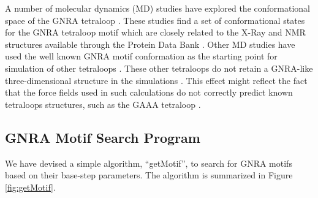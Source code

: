 A  number  of  molecular  dynamics  (MD)  studies  have  explored  the
conformational   space  of   the  GNRA   tetraloop  \cite{cornell1995,
  sorin2002, spackova2010,  depaul2010}. These  studies find a  set of
conformational states  for the GNRA tetraloop motif  which are closely
related to the X-Ray and  NMR structures available through the Protein
Data Bank  \cite{depaul2010, sorin2002}.   Other MD studies  have used
the  well known  GNRA motif  conformation  as the  starting point  for
simulation  of other  tetraloops  \cite{srinivasan1998}.  These  other
tetraloops do  not retain  a GNRA-like three-dimensional  structure in
the simulations  \cite{srinivasan1998}. This effect  might reflect the
fact   that    the   force   fields   used    in   such   calculations
\cite{cornell1995}   do  not   correctly   predict  known   tetraloops
structures, such as the GAAA tetraloop \cite{spackova2010}.

\subsection{GNRA Motif Search Program}
We have devised  a simple algorithm, ``getMotif'', to  search for GNRA
motifs  based  on  their  base-step  parameters.   The  algorithm  is
summarized in Figure \ref{fig:getMotif}.

